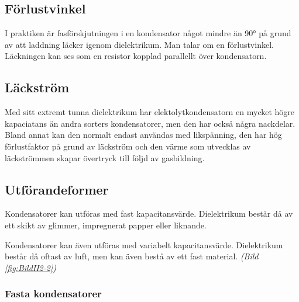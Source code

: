 \subsection{Förlustvinkel}

I praktiken är fasförskjutningen i en kondensator något mindre än \ang{90} på
grund av att laddning läcker igenom dielektrikum. Man talar om en förlustvinkel.
Läckningen kan ses som en resistor kopplad parallellt över kondensatorn.

\subsection{Läckström}

Med sitt extremt tunna dielektrikum har elektolytkondensatorn en mycket högre
kapaciatans än andra sorters kondensatorer, men den har också några nackdelar.  
Bland annat kan den normalt endast användas med likspänning, den har hög 
förlustfaktor på grund av läckström och den värme som utvecklas av läckströmmen 
skapar övertryck till följd av gasbildning.

\subsection{Utförandeformer}

Kondensatorer kan utföras med fast kapacitansvärde.
Dielektrikum består då av ett skikt av glimmer, impregnerat papper eller liknande.

Kondensatorer kan även utföras med variabelt kapacitansvärde.
Dielektrikum består då oftast av luft, men kan även bestå av ett fast material.
\emph{(Bild \ref{fig:BildII2-2})}

\subsubsection{Fasta kondensatorer}



